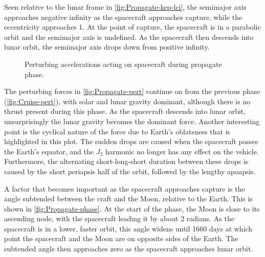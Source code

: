 Seen relative to the lunar frame in \autoref{fig:Propagate-kep-lci}, the semimajor axis approaches negative infinity as the spacecraft approaches capture, while the eccentricity approaches 1. At the point of capture, the spacecraft is in a parabolic orbit and the semimajor axis is undefined. As the spacecraft then descends into lunar orbit, the semimajor axis drops down from positive infinity.

\begin{figure}
\centering
\def\svgwidth{\figurewidth}

\caption{Perturbing accelerations acting on spacecraft during propagate phase.} \label{fig:Propagate-pert}
\end{figure}

The perturbing forces in \autoref{fig:Propagate-pert} continue on from the previous phase (\autoref{fig:Cruise-pert}), with solar and lunar gravity dominant, although there is no thrust present during this phase. As the spacecraft descends into lunar orbit, unsurprisingly the lunar gravity becomes the dominant force. Another interesting point is the cyclical nature of the force due to Earth's oblateness that is highlighted in this plot. The sudden drops are caused when the spacecraft passes the Earth's equator, and the $J_2$ harmonic no longer has any effect on the vehicle. Furthermore, the alternating short-long-short duration between these drops is caused by the short periapsis half of the orbit, followed by the lengthy apoapsis.

%

A factor that becomes important as the spacecraft approaches capture is the angle subtended between the craft and the Moon, relative to the Earth. This is shown in \autoref{fig:Propagate-phase}. At the start of the phase, the Moon is close to its ascending node, with the spacecraft leading it by about 2 radians. As the spacecraft is in a lower, faster orbit, this angle widens until 1660 days at which point the spacecraft and the Moon are on opposite sides of the Earth. The subtended angle then approaches zero as the spacecraft approaches lunar orbit.

